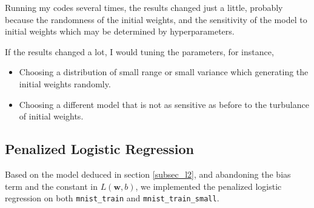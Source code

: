 \documentclass[10pt]{article}
\begin{document}
Running my codes several times, the results changed just a little, probably because the randomness of the initial weights, and the sensitivity of the model to initial weights which may be determined by hyperparameters.\par
If the results changed a lot, I would tuning the parameters, for instance,
\begin{itemize}
\item Choosing a distribution of small range or small variance which generating the initial weights randomly.
\item Choosing a different model that is not as sensitive as before to the turbulance of initial weights.
\end{itemize}
\subsection{Penalized Logistic Regression}
Based on the model deduced in section \ref{subsec_l2}, and abandoning the bias term and the constant in $L\left(\mathbf{w}, b\right)$, we implemented the penalized logistic regression on both \texttt{mnist\_train} and \texttt{mnist\_train\_small}.
\end{document}
